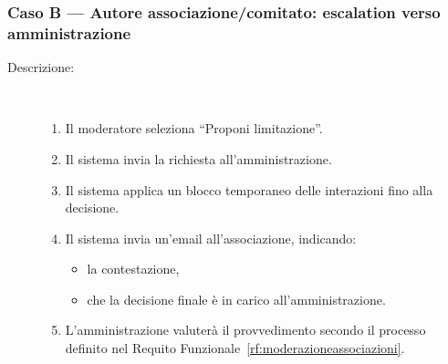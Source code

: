 \begin{ucscope}
\subsubsection*{Caso B — Autore associazione/comitato: escalation verso amministrazione}

\begin{description}
	\item[Descrizione:]~
	\begin{enumerate}
		\item Il moderatore seleziona ``Proponi limitazione''.
		\item Il sistema invia la richiesta all’amministrazione.
		\item Il sistema applica un blocco temporaneo delle interazioni fino alla decisione.
		\item Il sistema invia un’email all’associazione, indicando:
		\begin{itemize}
			\item la contestazione,
			\item che la decisione finale è in carico all’amministrazione.
		\end{itemize}
		\item L’amministrazione valuterà il provvedimento secondo il processo definito nel Requito Funzionale~\ref{rf:moderazioneassociazioni}.
	\end{enumerate}
\end{description}

\end{ucscope}
